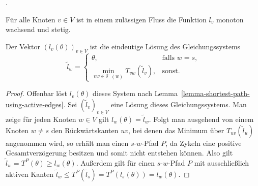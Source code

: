 .

\begin{lemma}
	Für alle Knoten $v\in V$ ist in einem zulässigen Fluss die Funktion $l_v$ monoton wachsend und stetig.
\end{lemma}

\begin{proposition}
	Der Vektor $(l_v(\theta))_{v\in V}$ ist die eindeutige Lösung des Gleichungssystems
	$$ \tilde{l}_w = \begin{cases}
	\theta, & \text{falls } w=s, \\
	\min\limits_{vw\in \delta^-(w)} T_{vw}(\tilde{l}_v), & \text{sonst}.
	\end{cases}$$
\end{proposition}
\begin{proof}
	Offenbar löst $l_v(\theta)$ dieses System nach Lemma~\ref{lemma-shortest-path-using-active-edges}.
	Sei $(\tilde{l}_v)_{v\in V}$ eine Lösung dieses Gleichungssystems.
	Man zeige für jeden Knoten $w\in V$ gilt $l_w(\theta) = \tilde{l}_w$.
	Folgt man ausgehend von einem Knoten $w\neq s$ den Rückwärtskanten $uv$, bei denen das Minimum über $T_{uv}(\tilde{l}_u)$ angenommen wird, so erhält man einen $s$-$w$-Pfad $P$, da Zykeln eine positive Gesamtverzögerung besitzen und somit nicht entstehen können.
	Also gilt $\tilde{l}_w = T^P(\theta) \geq l_w(\theta)$.
	Außerdem gilt für einen $s$-$w$-Pfad $P$ mit ausschließlich aktiven Kanten $\tilde{l}_w \leq T^P(\tilde{l}_s) = T^P(l_s(\theta)) = l_w(\theta)$.
\end{proof}
